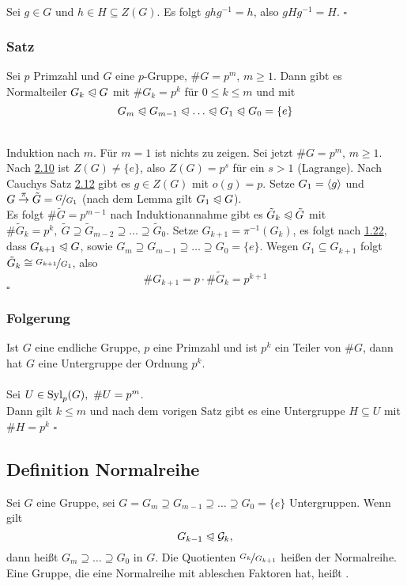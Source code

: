 \\
Sei $g\in G$ und $h\in H\subseteq Z(G)$. 
Es folgt $ghg^{-1}=h$, also $gHg^{-1}=H$.
\hfill $\square$

\subsubsection*{Satz}
Sei $p$ Primzahl und $G$ eine $p$-Gruppe, $\#G=p^m$, $m\ge 1$. 
Dann gibt es Normalteiler $G_k\trianglelefteqslant G$ mit $\#G_k=p^k$ für $0\le k\le m$ und mit 
\[
G_m\nt G_{m-1}\nt \dots \nt G_1\nt G_0=\{e\} 
\]

\\
Induktion nach $m$. 
Für $m=1$ ist nichts zu zeigen. 
Sei jetzt $\#G=p^m$, $m\ge 1$.\\
Nach \hyperref[sub:kor_zentrum]{2.10} ist $Z(G)\not=\{e\}$, also $Z(G)=p^s$ für ein $s>1$ (Lagrange). 
Nach Cauchys Satz \hyperref[sub:cauchys_satz]{2.12} gibt es $g\in Z(G)$ mit $o(g)=p$. 
Setze $G_1=\langle g \rangle$ und $G\stackrel{\pi}{\to}\tilde{G}=\nicefrac{G}{G_1}$ (nach dem Lemma gilt $G_1\trianglelefteqslant G$).\\
Es folgt $\#\tilde{G}=p^{m-1}$ nach Induktionannahme gibt es $\tilde{G}_k\trianglelefteqslant \tilde{G}$ mit $\#\tilde{G}_k=p^k,~\tilde{G}\supseteq \tilde{G}_{m-2}\supseteq \dots \supseteq \tilde{G}_0$. 
Setze $G_{k+1}=\pi^{-1}(G_k)$, es folgt nach \hyperref[sub:satz_eigenschaften]{1.22}, dass $G_{k+1}\trianglelefteqslant G$, sowie $G_m\supseteq G_{m-1}\supseteq \dots \supseteq G_0=\{e\}$. 
Wegen $G_1\subseteq G_{k+1}$ folgt $\tilde{G}_k\cong \nicefrac{G_{k+1}}{G_1}$, also 
\[
\#G_{k+1}=p\cdot \#\tilde{G}_k=p^{k+1} 
\]
\hfill $\square$

\subsubsection*{Folgerung}
Ist $G$ eine endliche Gruppe, $p$ eine Primzahl und ist $p^k$ ein Teiler von $\#G$, dann hat $G$ eine Untergruppe der Ordnung $p^k$.\\

\\
Sei $U\in \operatorname{Syl}_p(G),~\#U=p^m$.\\
Dann gilt $k\le m$ und nach dem vorigen Satz gibt es eine Untergruppe $H\subseteq U$ mit $\#H=p^k$
\hfill $\square$

\subsection{Definition Normalreihe}
\label{sub:def_normalreihe}
Sei $G$ eine Gruppe, sei $G=G_m\supseteq G_{m-1}\supseteq \dots\supseteq G_0=\{e\}$ Untergruppen. 
Wenn gilt 
\[
G_{k-1}\trianglelefteqslant \mathcal{G}_k, 
\]
dann heißt $G_m\supseteq \dots\supseteq G_0$  in $G$. 
Die Quotienten $\nicefrac{G_k}{G_{k+1}}$ heißen  der Normalreihe.\\
Eine Gruppe, die eine Normalreihe mit ableschen Faktoren hat, heißt .


